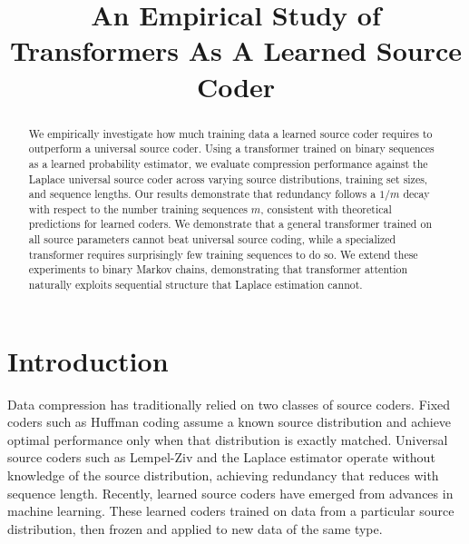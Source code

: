 \documentclass[conference]{IEEEtran}
\begin{document}
\title{An Empirical Study of Transformers As A Learned Source Coder}

\author{
}

\maketitle

\begin{abstract}
We empirically investigate how much training data a learned source coder requires to outperform a universal source coder. Using a transformer trained on binary sequences as a learned probability estimator, we evaluate compression performance against the Laplace universal source coder across varying source distributions, training set sizes, and sequence lengths. Our results demonstrate that redundancy follows a $1/m$ decay with respect to the number training sequences $m$, consistent with theoretical predictions for learned coders. We demonstrate that a general transformer trained on all source parameters cannot beat universal source coding, while a specialized transformer requires surprisingly few training sequences to do so. We extend these experiments to binary Markov chains, demonstrating that transformer attention naturally exploits sequential structure that Laplace estimation cannot.
\end{abstract}


\section{Introduction}

Data compression has traditionally relied on two classes of source coders. Fixed coders such as Huffman coding assume a known source distribution and achieve optimal performance only when that distribution is exactly matched. Universal source coders such as Lempel-Ziv \cite{lz77} and the Laplace estimator \cite{krichevsky} operate without knowledge of the source distribution, achieving redundancy that reduces with sequence length. Recently, learned source coders have emerged from advances in machine learning. These learned coders trained on data from a particular source distribution, then frozen and applied to new data of the same type.
\end{document}
